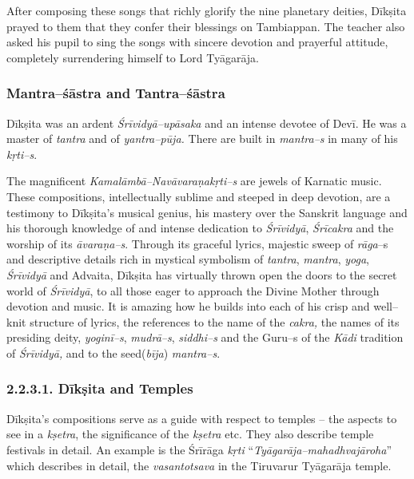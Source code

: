 After composing these songs that richly glorify the nine planetary deities, Dīkṣita prayed to them that they confer their blessings on Tambiappan. The teacher also asked his pupil to sing the songs with sincere devotion and prayerful attitude, completely surrendering himself to Lord Tyāgarāja.


\subsubsection*{Mantra–śāstra and Tantra–śāstra}

Dīkṣita was an ardent \textit{Śrīvidyā–upāsaka} and an intense devotee of Devī. He was a master of \textit{tantra} and of \textit{yantra–pūja.} There are built in \textit{mantra–s} in many of his \textit{kṛti–s}.

The magnificent \textit{Kamalāmbā–Navāvaraṇakṛti–s} are jewels of Karnatic music. These compositions, intellectually sublime and steeped in deep devotion, are a testimony to Dīkṣita’s musical genius, his mastery over the Sanskrit language and his thorough knowledge of and intense dedication to \textit{Śrīvidyā}, \textit{Śrīcakra} and the worship of its \textit{āvaraṇa–s}. Through its graceful lyrics, majestic sweep of \textit{rāga}–s and descriptive details rich in mystical symbolism of \textit{tantra}, \textit{mantra}, \textit{yoga}, \textit{Śrīvidyā} and Advaita, Dīkṣita has virtually thrown open the doors to the secret world of \textit{Śrīvidyā}, to all those eager to approach the Divine Mother through devotion and music. It is amazing how he builds into each of his crisp and well–knit structure of lyrics, the references to the name of the \textit{cakra,} the names of its presiding deity, \textit{yoginī–s}, \textit{mudrā–s}, \textit{siddhi–s} and the Guru–s of the \textit{Kādi} tradition of \textit{Śrīvidyā,} and to the seed(\textit{bīja}) \textit{mantra–s}.


\subsubsection*{2.2.3.1. Dīkṣita and Temples}

Dīkṣita’s compositions serve as a guide with respect to temples – the aspects to see in a \textit{kṣetra}, the significance of the \textit{kṣetra} etc. They also describe temple festivals in detail. An example is the Śrīrāga\textit{ kṛti} “\textit{Tyāgarāja–mahadhvajāroha}” which describes in detail, the \textit{vasantotsava} in the Tiruvarur Tyāgarāja temple.


